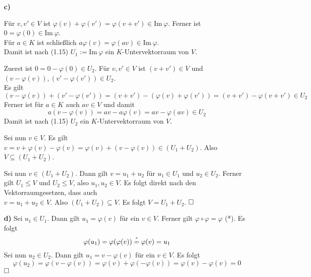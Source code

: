 \documentclass[a4paper,graphics,11pt]{article}
\newcommand{\up}[2]{\mathrel{\overset{\makebox[0pt]{\mbox{\normalfont\tiny #2}}}{#1}}}
\begin{document}
\textbf{c)}

Für $v, v' \in V$ ist $\varphi(v) + \varphi(v') = \varphi(v+v') \in \text{Im}\ \varphi$.
Ferner ist $0 = \varphi(0) \in \text{Im}\ \varphi$.\\
Für $a \in K$ ist schließlich $a\varphi(v) = \varphi(av) \in \text{Im}\ \varphi$.\\
Damit ist nach (1.15)
$U_1 := \text{Im}\ \varphi$ ein $K$-Untervektorraum von $V$.

\newpage

Zuerst ist $0 = 0 - \varphi(0) \in U_2$.
Für $v, v' \in V$ ist $(v+v') \in V$ und $(v - \varphi(v)), (v' -\varphi(v')) \in U_2$.\\
Es gilt
$$
    (v - \varphi(v)) + (v' - \varphi(v'))
    = (v + v') - (\varphi(v) + \varphi(v'))
    = (v+v') - \varphi(v+v') \in U_2
$$
Ferner ist für $a \in K$ auch $av \in V$ und damit
$$
    a(v - \varphi(v)) = av - a\varphi(v) = av - \varphi(av) \in U_2
$$
Damit ist nach (1.15) $U_2$ ein $K$-Untervektorraum von $V$.

Sei nun $v \in V$. Es gilt $v = v + \varphi(v) - \varphi(v) = \varphi(v) + (v - \varphi(v)) \in (U_1 + U_2)$.
Also $V \subseteq (U_1 + U_2)$.

Sei nun $v \in (U_1 + U_2)$. Dann gilt $v = u_1 + u_2$ für $u_1 \in U_1$ und $u_2 \in U_2$.
Ferner gilt $U_1 \leq V$ und $U_2 \leq V$, also $u_1, u_2 \in V$. Es folgt direkt nach den
Vektorraumgesetzen, dass auch\\
$v = u_1 + u_2 \in V$.
Also $(U_1 + U_2) \subseteq V$. Es folgt $V = U_1 + U_2$. $\hfill\square$

\textbf{d)}
Sei $u_1 \in U_1$. Dann gilt $u_1 = \varphi(v)$ für ein $v \in V$. Ferner gilt $\varphi \circ \varphi = \varphi$ (*).
Es folgt
$$
    \varphi(u_1)
    = \varphi(\varphi(v))
    \up{=}{*} \varphi(v)
    = u_1
$$
Sei nun $u_2 \in U_2$. Dann gilt $u_1 = v - \varphi(v)$ für ein $v \in V$. Es folgt
$$
    \varphi(u_2)
    = \varphi(v - \varphi(v))
    = \varphi(v) + \varphi(-\varphi(v))
    = \varphi(v) - \varphi(v)
    = 0
$$
$\strut\hfill\square$
\end{document}
